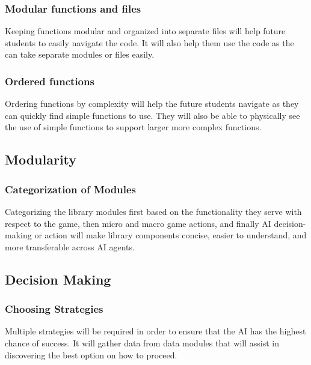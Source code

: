 \documentclass[10pt,letterpaper,onecolumn,draftclsnofoot]{IEEEtran}
\begin{document}
\subsubsection{Modular functions and files}
	Keeping functions modular and organized into separate files will help future students to easily navigate the code. It will also help them use the code as the can take separate modules or files easily.

\subsubsection{Ordered functions}
	Ordering functions by complexity will help the future students navigate as they can quickly find simple functions to use. They will also be able to physically see the use of simple functions to support larger more complex functions.
\subsection{Modularity}
\subsubsection{Categorization of Modules}
	Categorizing the library modules first based on the functionality they serve with respect to the game, then micro and macro game actions, and finally AI decision-making or action will make library components concise, easier to understand, and more transferable across AI agents.
\subsection{Decision Making}
\subsubsection{Choosing Strategies}
	Multiple strategies will be required in order to ensure that the AI has the highest chance of success. It will gather data from data modules that will assist in discovering the best option on how to proceed. 
\end{document}
